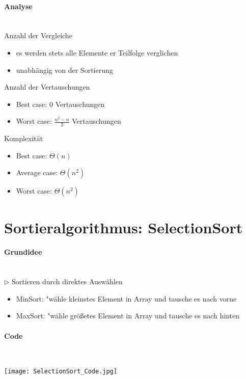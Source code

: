 \paragraph{Analyse} \mbox{} \\
Anzahl der Vergleiche
\begin{itemize}
	\item es werden stets alle Elemente er Teilfolge verglichen
	\item unabhängig von der Sortierung
\end{itemize}
Anzahl der Vertauschungen
\begin{itemize}
	\item Best case: 0 Vertauschungen
	\item Worst case: $\frac{n^2 - n}{2}$ Vertauschungen
\end{itemize}
Komplexität
\begin{itemize}
	\item Best case: $\Theta (n)$
	\item Average case: $\Theta (n^2)$
	\item Worst case: $\Theta (n^2)$
\end{itemize}



\vspace{1.5cm}
\section{Sortieralgorithmus: SelectionSort} %

	\paragraph{Grundidee} \mbox{} \\
	$\rhd$ Sortieren durch direktes Auswählen
	\begin{itemize}
		\item MinSort: "wähle kleinstes Element in Array und tausche es nach vorne
		\item MaxSort: "wähle grö\ss etes Element in Array und tausche es nach hinten
	\end{itemize}

	\paragraph{Code} \mbox{} \\

	\begin{center}
		\texttt{[image: SelectionSort\_Code.jpg]}
	\end{center}



